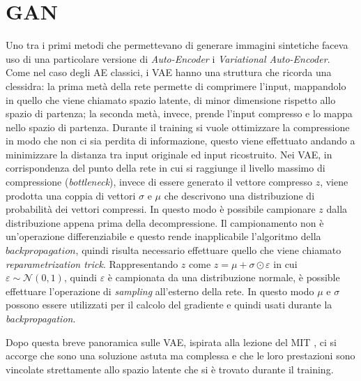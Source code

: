 

\section{GAN}
Uno tra i primi metodi che permettevano di generare immagini sintetiche faceva uso di una particolare versione di \emph{Auto-Encoder} i \emph{Variational Auto-Encoder}.
Come nel caso degli AE classici, i VAE hanno una struttura che ricorda una clessidra: la prima metà della rete permette di comprimere l'input, mappandolo in quello che viene chiamato spazio latente, di minor dimensione rispetto allo spazio di partenza;  la seconda metà, invece, prende l'input compresso e lo mappa nello spazio di partenza.
Durante il training si vuole ottimizzare la compressione in modo che non ci sia perdita di informazione, questo viene effettuato andando a minimizzare la distanza tra input originale ed input ricostruito.
Nei VAE, in corrispondenza del punto della rete in cui si raggiunge il livello massimo di compressione (\emph{bottleneck}), invece di essere generato il vettore compresso $z$, viene prodotta una coppia di vettori $\sigma$ e $\mu$ che descrivono una distribuzione di probabilità dei vettori compressi.
In questo modo è possibile campionare $z$ dalla distribuzione appena prima della decompressione.
Il campionamento non è un'operazione differenziabile e questo rende inapplicabile l'algoritmo della $backpropagation$, quindi risulta necessario effettuare quello che viene chiamato \emph{reparametrization trick}.
Rappresentando $z$ come $z = \mu + \sigma \odot \varepsilon$ in cui $\varepsilon \sim \mathcal{N}(0,1)$, quindi $\varepsilon$ è campionata da una distribuzione normale, è possible effettuare l'operazione di \emph{sampling} all'esterno della rete.
In questo modo $\mu$ e $\sigma$ possono essere utilizzati per il calcolo del gradiente e quindi usati durante la \emph{backpropagation}.

Dopo questa breve panoramica sulle VAE, ispirata alla lezione del MIT \cite{MIT_GEN}, ci si accorge che sono una soluzione astuta ma complessa e che le loro prestazioni sono vincolate strettamente allo spazio latente che si è trovato durante il training.

